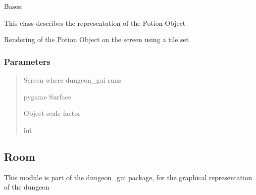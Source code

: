 \documentclass[letterpaper,10pt,english]{sphinxmanual}
\begin{document}
\begin{fulllineitems}
\label{\detokenize{api_reference/dungeon_gui/Potion:Potion.Potion}}
\pysigstartsignatures
{}
\pysigstopsignatures
\sphinxAtStartPar
Bases: 

\sphinxAtStartPar
This class describes the representation of the Potion Object

\begin{fulllineitems}
\label{\detokenize{api_reference/dungeon_gui/Potion:Potion.Potion.render_collectable}}
\pysigstartsignatures
{}
\pysigstopsignatures
\sphinxAtStartPar
Rendering of the Potion Object on the screen using a tile set


\subsubsection{Parameters}
\label{\detokenize{api_reference/dungeon_gui/Potion:parameters}}\begin{quote}\begin{description}
\sphinxAtStartPar
Screen where dungeon\_gui runs

\sphinxAtStartPar
pygame Surface

\sphinxAtStartPar
Object scale factor

\sphinxAtStartPar
int

\end{description}\end{quote}

\end{fulllineitems}


\end{fulllineitems}


\sphinxstepscope


\subsection{Room}
\label{\detokenize{api_reference/dungeon_gui/Room:module-Room}}\label{\detokenize{api_reference/dungeon_gui/Room:room}}\label{\detokenize{api_reference/dungeon_gui/Room::doc}}
\sphinxAtStartPar
This module is part of the dungeon\_gui package, for the graphical representation of the dungeon
\end{document}
